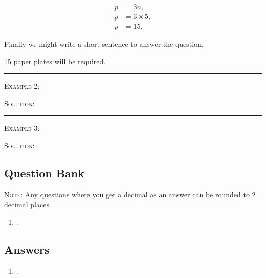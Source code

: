 \documentclass[a4paper,12pt]{article}
\begin{document}
\begin{align*}
p &= 3n, \\
p &= 3\times 5, \\
p &= 15.
\end{align*}

Finally we might write a short sentence to answer the question,

\begin{displayquote}
15 paper plates will be required.
\end{displayquote}

\vspace{3mm}
\hrule
\vspace{3mm}

\textsc{Example 2}: 

\textsc{Solution}: 

\vspace{3mm}
\hrule
\vspace{3mm}

\textsc{Example 3}: 

\textsc{Solution}: 

\newpage
\subsection*{Question Bank}

\textsc{Note}: Any questions where you get a decimal as an answer
can be rounded to 2 decimal places.

\begin{enumerate}
\item .

\end{enumerate}

\newpage
\subsection*{Answers}

\begin{enumerate}
\item .
\end{enumerate}
\end{document}
